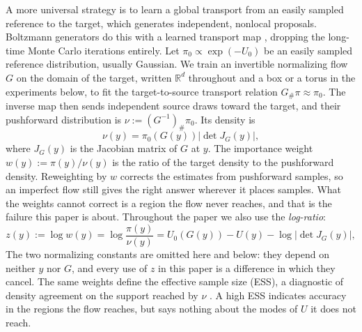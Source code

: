 \documentclass{article}
\begin{document}
A more universal strategy is to learn a global transport from an easily sampled reference to the target, which generates independent, nonlocal proposals. Boltzmann generators do this with a learned transport map \citep{noe2019boltzmann}, dropping the long-time Monte Carlo iterations entirely. Let $\pi_0\propto\exp(-U_0)$ be an easily sampled reference distribution, usually Gaussian. We train an invertible normalizing flow $G$ \citep{rezende2015variational,papamakarios2017masked,kingma2018glow} on the domain of the target, written $\mathbb R^d$ throughout and a box or a torus in the experiments below, to fit the target-to-source transport relation $G_{\#}\pi\approx\pi_0$. The inverse map then sends independent source draws toward the target, and their pushforward distribution is $\nu:=(G^{-1})_{\#}\pi_0$. Its density is
\begin{equation}
    \nu(y)=\pi_0(G(y))\left|\det J_G(y)\right|,
    \label{eq: pushforward-density}
\end{equation}
where $J_G(y)$ is the Jacobian matrix of $G$ at $y$. The importance weight $w(y):=\pi(y)/\nu(y)$ is the ratio of the target density to the pushforward density. Reweighting by $w$ corrects the estimates from pushforward samples, so an imperfect flow still gives the right answer wherever it places samples. What the weights cannot correct is a region the flow never reaches, and that is the failure this paper is about. Throughout the paper we also use the \emph{log-ratio}:
\begin{equation}
	z(y) := \log w(y) = \log \frac{\pi(y)}{\nu(y)} =  U_0(G(y)) - U(y) - \log|\det J_G(y)| ,
	\label{eq: log-ratio}
\end{equation}
The two normalizing constants are omitted here and below: they depend on neither $y$ nor $G$, and every use of $z$ in this paper is a difference in which they cancel. The same weights define the effective sample size (ESS), a diagnostic of density agreement on the support reached by $\nu$ \citep{liu2001monte,doucet2001introduction,martino2017rethinking}. A high ESS indicates accuracy in the regions the flow reaches, but says nothing about the modes of $U$ it does not reach.
\end{document}

